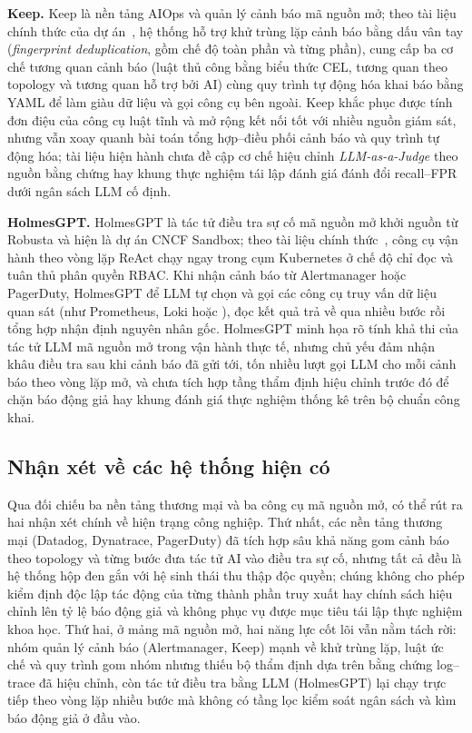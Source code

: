 \textbf{Keep.} Keep là nền tảng AIOps và quản lý cảnh báo mã nguồn mở; theo tài liệu chính thức của dự án~\cite{keep2026docs}, hệ thống hỗ trợ khử trùng lặp cảnh báo bằng dấu vân tay (\emph{fingerprint deduplication}, gồm chế độ toàn phần và từng phần), cung cấp ba cơ chế tương quan cảnh báo (luật thủ công bằng biểu thức CEL, tương quan theo topology và tương quan hỗ trợ bởi AI) cùng quy trình tự động hóa khai báo bằng YAML để làm giàu dữ liệu và gọi công cụ bên ngoài. Keep khắc phục được tính đơn điệu của công cụ luật tĩnh và mở rộng kết nối tốt với nhiều nguồn giám sát, nhưng vẫn xoay quanh bài toán tổng hợp--điều phối cảnh báo và quy trình tự động hóa; tài liệu hiện hành chưa đề cập cơ chế hiệu chỉnh \emph{LLM-as-a-Judge} theo nguồn bằng chứng hay khung thực nghiệm tái lập đánh giá đánh đổi recall--FPR dưới ngân sách LLM cố định.

\textbf{HolmesGPT.} HolmesGPT là tác tử điều tra sự cố mã nguồn mở khởi nguồn từ Robusta và hiện là dự án CNCF Sandbox; theo tài liệu chính thức~\cite{holmesgpt2026docs}, công cụ vận hành theo vòng lặp ReAct chạy ngay trong cụm Kubernetes ở chế độ chỉ đọc và tuân thủ phân quyền RBAC. Khi nhận cảnh báo từ Alertmanager hoặc PagerDuty, HolmesGPT để LLM tự chọn và gọi các công cụ truy vấn dữ liệu quan sát (như Prometheus, Loki hoặc ), đọc kết quả trả về qua nhiều bước rồi tổng hợp nhận định nguyên nhân gốc. HolmesGPT minh họa rõ tính khả thi của tác tử LLM mã nguồn mở trong vận hành thực tế, nhưng chủ yếu đảm nhận khâu điều tra sau khi cảnh báo đã gửi tới, tốn nhiều lượt gọi LLM cho mỗi cảnh báo theo vòng lặp mở, và chưa tích hợp tầng thẩm định hiệu chỉnh trước đó để chặn báo động giả hay khung đánh giá thực nghiệm thống kê trên bộ chuẩn công khai.

\subsection{Nhận xét về các hệ thống hiện có}
\label{sec:ch3-nhan-xet}

Qua đối chiếu ba nền tảng thương mại và ba công cụ mã nguồn mở, có thể rút ra hai nhận xét chính về hiện trạng công nghiệp. Thứ nhất, các nền tảng thương mại (Datadog, Dynatrace, PagerDuty) đã tích hợp sâu khả năng gom cảnh báo theo topology và từng bước đưa tác tử AI vào điều tra sự cố, nhưng tất cả đều là hệ thống hộp đen gắn với hệ sinh thái thu thập độc quyền; chúng không cho phép kiểm định độc lập tác động của từng thành phần truy xuất hay chính sách hiệu chỉnh lên tỷ lệ báo động giả và không phục vụ được mục tiêu tái lập thực nghiệm khoa học. Thứ hai, ở mảng mã nguồn mở, hai năng lực cốt lõi vẫn nằm tách rời: nhóm quản lý cảnh báo (Alertmanager, Keep) mạnh về khử trùng lặp, luật ức chế và quy trình gom nhóm nhưng thiếu bộ thẩm định dựa trên bằng chứng log--trace đã hiệu chỉnh, còn tác tử điều tra bằng LLM (HolmesGPT) lại chạy trực tiếp theo vòng lặp nhiều bước mà không có tầng lọc kiểm soát ngân sách và kìm báo động giả ở đầu vào.

